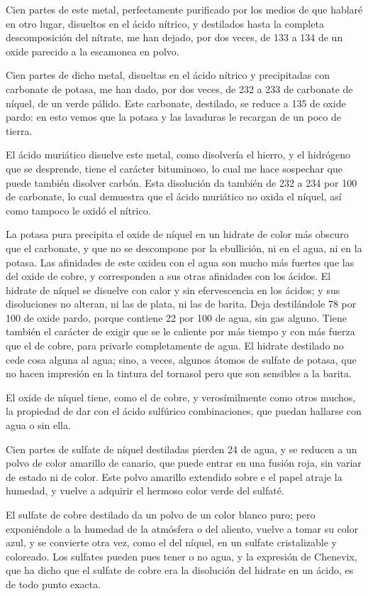 \documentclass[a4paper, 11pt, oneside, polutonikogreek, spanish]{article}
\begin{document}
Cien partes de este metal, perfectamente purificado por los medios de que hablaré en otro lugar, disueltos en el ácido nítrico, y destilados hasta la completa descomposición del nítrate, me han dejado, por dos veces, de 133 a 134 de un oxide parecido a la escamonea en polvo.

Cien partes de dicho metal, disueltas en el ácido nítrico y precipitadas con carbonate de potasa, me han dado, por dos veces, de 232 a 233 de carbonate de níquel, de un verde pálido. Este carbonate, destilado, se reduce a 135 de oxide pardo: en esto vemos que la potasa y las lavaduras le recargan de un poco de tierra.

El ácido muriático disuelve este metal, como disolvería el hierro, y el hidrógeno que se desprende, tiene el carácter bituminoso, lo cual me hace sospechar que puede también disolver carbón. Esta disolución da también de 232 a 234 por 100 de carbonate, lo cual demuestra que el ácido muriático no oxida el níquel, así como tampoco le oxidó el nítrico.

La potasa pura precipita el oxide de níquel en un hidrate de color más obscuro que el carbonate, y que no se descompone por la ebullición, ni en el agua, ni en la potasa. Las afinidades de este oxiden con el agua son mucho más fuertes que las del oxide de cobre, y corresponden a sus otras afinidades con los ácidos. El hidrate de níquel se disuelve con calor y sin efervescencia en los ácidos; y sus disoluciones no alteran, ni las de plata, ni las de barita. Deja destilándole 78 por 100 de oxide pardo, porque contiene 22 por 100 de agua, sin gas alguno. Tiene también el carácter de exigir que se le caliente por más tiempo y con más fuerza que el de cobre, para privarle completamente de agua. El hidrate destilado no cede cosa alguna al agua; sino, a veces, algunos átomos de sulfate de potasa, que no hacen impresión en la tintura del tornasol pero que son sensibles a la barita.

El oxide de níquel tiene, como el de cobre, y verosímilmente como otros muchos, la propiedad de dar con el ácido sulfúrico combinaciones, que puedan hallarse con agua o sin ella.

Cien partes de sulfate de níquel destiladas pierden 24 de agua, y se reducen a un polvo de color amarillo de canario, que puede entrar en una fusión roja, sin variar de estado ni de color. Este polvo amarillo extendido sobre e el papel atraje la humedad, y vuelve a adquirir el hermoso color verde del sulfaté.

El sulfate de cobre destilado da un polvo de un color blanco puro; pero exponiéndole a la humedad de la atmósfera o del aliento, vuelve a tomar su color azul, y se convierte otra vez, como el del níquel, en un sulfate cristalizable y coloreado. Los sulfates pueden pues tener o no agua, y la expresión de Chenevix, que ha dicho que el sulfate de cobre era la disolución del hidrate en un ácido, es de todo punto exacta.
\end{document}
